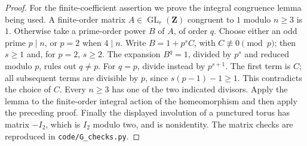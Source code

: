 \begin{proof}
For the finite-coefficient assertion we prove the integral congruence
lemma being used. A finite-order matrix $A\in\operatorname{GL}_r(\mathbf Z)$
congruent to $1$ modulo $n\geq3$ is $1$. Otherwise take a prime-order
power $B$ of $A$, of order $q$. Choose either an odd prime $p\mid n$,
or $p=2$ when $4\mid n$. Write
$B=1+p^s C$, with $C\not\equiv0\pmod p$; then $s\geq1$ and, for
$p=2$, $s\geq2$. The expansion $B^q=1$, divided by $p^s$ and reduced
modulo $p$, rules out $q\ne p$. For $q=p$, divide instead by
$p^{s+1}$. The first term is $C$; all subsequent terms are divisible by
$p$, since $s(p-1)-1\geq1$. This contradicts the choice of $C$.
Every $n\geq3$ has one of the two indicated divisors. Apply the lemma
to the finite-order integral action of the homeomorphism and then apply
the preceding proof. Finally the displayed involution of a punctured
torus has matrix $-I_2$, which is $I_2$ modulo two, and is nonidentity.
The matrix checks are reproduced in \texttt{code/G\_checks.py}.
\end{proof}

